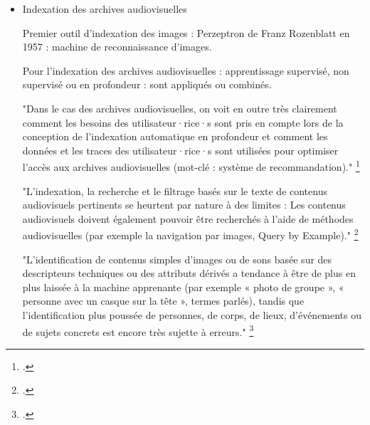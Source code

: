 \begin{itemize}
	"there is a near-linear relationship between quality of transcriptions and search performance.» : importance de la qualité de la transcription audiovisuelle pour améliorer la recherche.
	\footcite{noord2021}
	
	"the application of AVP tools to large image datasets significantly scales up the level of analysis from ‘close’ to ‘distant’ viewing, allowing scholars to observe patterns in the data that are invisible in the traditional, interpretative analyses of small sample sets.» 
	le distant viewing permet de passer d'une lecture individuelle d'items à une analyse d'éléments à l'échelle d'un corpus. 
	\footcite{noord2021}
	
	"« Digital tools for paper resources have tended not to consider the strong presence of visual elements in them. Due to the lack of practically available AVP tools to digital humanities, scholarly research has ‘grossly neglected visual content, causing a lopsided representation of all sorts of digitized archives’. »
	Sous représentation des éléments visuels dans l'indexation, même pour une collection audidiovisuelle. Les métadonnées textuelles liéees aux films sont nsuffisantes pour enrichir leurs métadonnées : titre, synopsis...
	\footcite{noord2021}
	
	
	\item Indexation des archives audiovisuelles 
	
	Premier outil d'indexation des images : Perzeptron de Franz Rozenblatt en 1957 : machine de reconnaissance d'images.
	
	Pour l'indexation des archives audiovisuelles : apprentissage supervisé, non supervisé ou en profondeur : sont appliqués ou combinés. 
	
	"Dans le cas des archives audiovisuelles, on voit en outre très clairement	comment les besoins des utilisateur·rice·s sont pris en compte lors de la conception de	l'indexation automatique en profondeur et comment les données et les traces des	utilisateur·rice·s sont utilisées pour optimiser l'accès aux archives audiovisuelles (mot-clé :	système de recommandation)."
	\footcite{zotero-item-584}
	
	"L'indexation, la recherche et le filtrage basés sur le texte de	contenus audiovisuels pertinents se heurtent par nature à des limites : Les contenus	audiovisuels doivent également pouvoir être recherchés à l'aide de méthodes audiovisuelles	(par exemple la navigation par images, Query by Example)."
	\footcite{zotero-item-584}
	
	"L'identification de contenus simples d'images ou de sons basée sur des descripteurs
	techniques ou des attributs dérivés a tendance à être de plus en plus laissée à la machine
	apprenante (par exemple « photo de groupe », « personne avec un casque sur la tête »,
	termes parlés), tandis que l'identification plus poussée de personnes, de corps, de lieux,
	d'événements ou de sujets concrets est encore très sujette à erreurs."
	\footcite{zotero-item-584}
	

\end{itemize}
